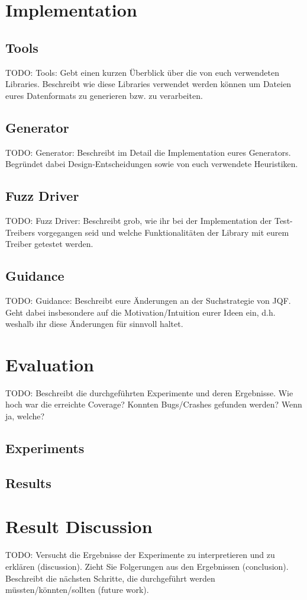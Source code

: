 \documentclass[runningheads]{llncs}
\begin{document}
\section{Implementation}
\subsection{Tools}
TODO: Tools: Gebt einen kurzen Überblick über die von euch verwendeten Libraries. Beschreibt wie diese Libraries verwendet werden können um Dateien eures Datenformats zu generieren bzw. zu verarbeiten.
\subsection{Generator}
TODO: Generator: Beschreibt im Detail die Implementation eures Generators. Begründet dabei Design-Entscheidungen sowie von euch verwendete Heuristiken.
\subsection{Fuzz Driver}
TODO: Fuzz Driver: Beschreibt grob, wie ihr bei der Implementation der Test-Treibers vorgegangen seid und welche Funktionalitäten der Library mit eurem Treiber getestet werden.
\subsection{Guidance}
TODO: Guidance: Beschreibt eure Änderungen an der Suchstrategie von JQF. Geht dabei insbesondere auf die Motivation/Intuition eurer Ideen ein, d.h. weshalb ihr diese Änderungen für sinnvoll haltet.


\section{Evaluation}
TODO: Beschreibt die durchgeführten Experimente und deren Ergebnisse. Wie hoch war die erreichte Coverage? Konnten Bugs/Crashes gefunden werden? Wenn ja, welche?
\subsection{Experiments}
\subsection{Results}

\section{Result Discussion}
TODO: Versucht die Ergebnisse der Experimente zu interpretieren und zu erklären (discussion). Zieht Sie Folgerungen aus den Ergebnissen (conclusion). Beschreibt die nächsten Schritte, die durchgeführt werden müssten/könnten/sollten (future work).
\end{document}
